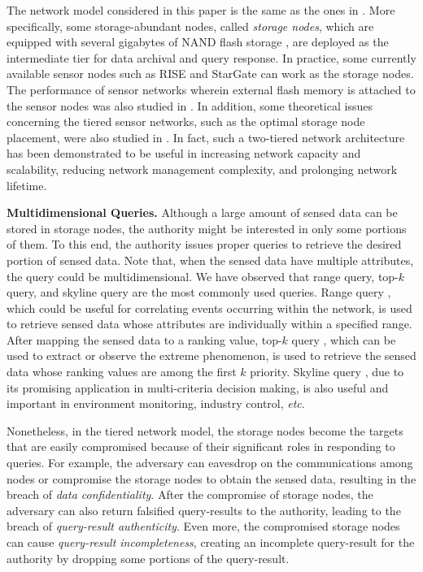 \documentclass[conference]{IEEEtran}
\begin{document}
The network model considered in this paper is the same as the ones in \cite{rksegyy03,dglls05}. More specifically, some storage-abundant nodes, called \emph{storage nodes}, which are equipped with several gigabytes of NAND flash storage \cite{slm06}, are deployed as the intermediate tier for data archival and query response. In practice, some currently available sensor nodes such as RISE \cite{RISE} and StarGate \cite{startgate} can work as the storage nodes. The performance of sensor networks wherein external flash memory is attached to the sensor nodes was also studied in \cite{mdgs06}. In addition, some theoretical issues concerning the tiered sensor networks, such as the optimal storage node placement, were also studied in \cite{slm06,stlm07}. In fact, such a two-tiered network architecture has been demonstrated to be useful in increasing network capacity and scalability, reducing network management complexity, and prolonging network lifetime.

\textbf{Multidimensional Queries.} Although a large amount of sensed data can be stored in storage nodes, the authority might be interested in only some portions of them. To this end, the authority issues proper queries to retrieve the desired portion of sensed data. Note that, when the sensed data have multiple attributes, the query could be multidimensional. We have observed that range query, top-$k$ query, and skyline query are the most commonly used queries. Range query \cite{lkgh03,mfhh05}, which could be useful for correlating events occurring within the network, is used to retrieve sensed data whose attributes are individually within a specified range. After mapping the sensed data to a ranking value, top-$k$ query \cite{wxtl07}, which can be used to extract or observe the extreme phenomenon, is used to retrieve the sensed data whose ranking values are among the first $k$ priority. Skyline query \cite{czg07,lcy08}, due to its promising application in multi-criteria decision making, is also useful and important in environment monitoring, industry control, \emph{etc}.

Nonetheless, in the tiered network model, the storage nodes become the targets that are easily compromised because of their significant roles in responding to queries. For example, the adversary can eavesdrop on the communications among nodes or compromise the storage nodes to obtain the sensed data, resulting in the breach of \emph{data confidentiality}. After the compromise of storage nodes, the adversary can also return falsified query-results to the authority, leading to the breach of \emph{query-result authenticity}. Even more, the compromised storage nodes can cause \emph{query-result incompleteness}, creating an incomplete query-result for the authority by dropping some portions of the query-result.
\end{document}
